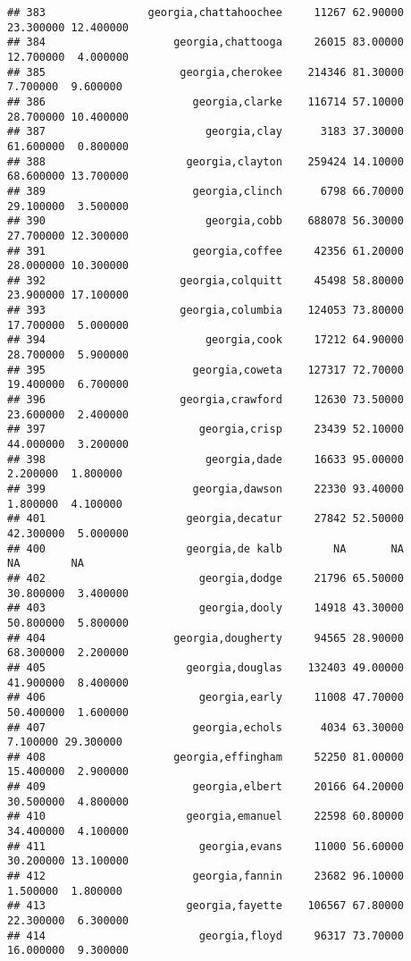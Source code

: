\documentclass[
]{article}
\begin{document}
\begin{verbatim}
## 383                georgia,chattahoochee     11267 62.90000 23.300000 12.400000
## 384                    georgia,chattooga     26015 83.00000 12.700000  4.000000
## 385                     georgia,cherokee    214346 81.30000  7.700000  9.600000
## 386                       georgia,clarke    116714 57.10000 28.700000 10.400000
## 387                         georgia,clay      3183 37.30000 61.600000  0.800000
## 388                      georgia,clayton    259424 14.10000 68.600000 13.700000
## 389                       georgia,clinch      6798 66.70000 29.100000  3.500000
## 390                         georgia,cobb    688078 56.30000 27.700000 12.300000
## 391                       georgia,coffee     42356 61.20000 28.000000 10.300000
## 392                     georgia,colquitt     45498 58.80000 23.900000 17.100000
## 393                     georgia,columbia    124053 73.80000 17.700000  5.000000
## 394                         georgia,cook     17212 64.90000 28.700000  5.900000
## 395                       georgia,coweta    127317 72.70000 19.400000  6.700000
## 396                     georgia,crawford     12630 73.50000 23.600000  2.400000
## 397                        georgia,crisp     23439 52.10000 44.000000  3.200000
## 398                         georgia,dade     16633 95.00000  2.200000  1.800000
## 399                       georgia,dawson     22330 93.40000  1.800000  4.100000
## 401                      georgia,decatur     27842 52.50000 42.300000  5.000000
## 400                      georgia,de kalb        NA       NA        NA        NA
## 402                        georgia,dodge     21796 65.50000 30.800000  3.400000
## 403                        georgia,dooly     14918 43.30000 50.800000  5.800000
## 404                    georgia,dougherty     94565 28.90000 68.300000  2.200000
## 405                      georgia,douglas    132403 49.00000 41.900000  8.400000
## 406                        georgia,early     11008 47.70000 50.400000  1.600000
## 407                       georgia,echols      4034 63.30000  7.100000 29.300000
## 408                    georgia,effingham     52250 81.00000 15.400000  2.900000
## 409                       georgia,elbert     20166 64.20000 30.500000  4.800000
## 410                      georgia,emanuel     22598 60.80000 34.400000  4.100000
## 411                        georgia,evans     11000 56.60000 30.200000 13.100000
## 412                       georgia,fannin     23682 96.10000  1.500000  1.800000
## 413                      georgia,fayette    106567 67.80000 22.300000  6.300000
## 414                        georgia,floyd     96317 73.70000 16.000000  9.300000

\end{verbatim}
\end{document}
